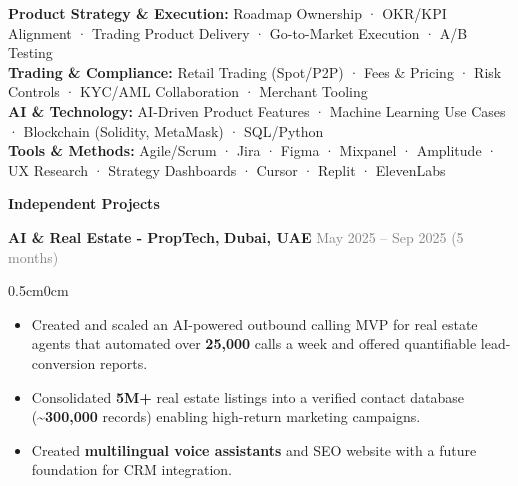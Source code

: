 \documentclass[a4paper,10pt]{article}
\newcommand{\info}[1]{#1}
\newcommand{\SectionStyle}{\fontsize{12.5}{14}\selectfont\bfseries}
\newcommand{\RoleStyle}{\fontsize{12}{14}\selectfont\bfseries}
\newcommand{\BodyStyle}{\fontsize{10}{12}\selectfont}
\newcommand{\sectiontitle}[1]{\begin{tcolorbox}[colback=black,colupper=white,sharp corners,boxrule=0pt,boxsep=3pt,left=0pt,right=0pt,top=1pt,bottom=1pt]{\SectionStyle \info{#1}}\end{tcolorbox}}
\newcommand{\position}[1]{{\RoleStyle \info{#1}}}\vspace{0.05em}
\newcommand{\bulletitem}[1]{\item {\BodyStyle \info{#1}}\vspace{0.1em}}
\newcommand{\graytext}[1]{\textcolor{grey}{\info{#1}}}
\newcommand{\boxedtext}[1]{\begin{mybox}\info{#1}\end{mybox}}
\newcommand{\kpi}[1]{\textbf{#1}}
\begin{document}
{{\boxedtext{\textbf{Product Strategy \& Execution:} Roadmap Ownership · OKR/KPI Alignment · Trading Product Delivery · Go-to-Market Execution · A/B Testing\\
\textbf{Trading \& Compliance:} Retail Trading (Spot/P2P) · Fees \& Pricing · Risk Controls · KYC/AML Collaboration · Merchant Tooling\\
\textbf{AI \& Technology:} AI-Driven Product Features · Machine Learning Use Cases · Blockchain (Solidity, MetaMask) · SQL/Python\\
\textbf{Tools \& Methods:} Agile/Scrum · Jira · Figma · Mixpanel · Amplitude · UX Research · Strategy Dashboards · Cursor · Replit · ElevenLabs}}

\vspace{5pt}
\sectiontitle{Independent Projects}
{\position{\info{AI \& Real Estate - PropTech,}} \small{\textbf{\info{Dubai, UAE}}}} \hfill{\large{\graytext{\info{May 2025 – Sep 2025 (5 months)}}}}
\begin{adjustwidth}{0.5cm}{0cm}
\normalsize
\begin{itemize}
  \bulletitem{Created and scaled an AI-powered outbound calling MVP for real estate agents that automated over \kpi{25,000} calls a week and offered quantifiable lead-conversion reports.}
  \bulletitem{Consolidated \kpi{5M+} real estate listings into a verified contact database (\textasciitilde\kpi{300,000} records) enabling high-return marketing campaigns.}
  \bulletitem{Created \textbf{multilingual voice assistants} and SEO website with a future foundation for CRM integration.}
\end{itemize}
\end{adjustwidth}

}
\end{document}
